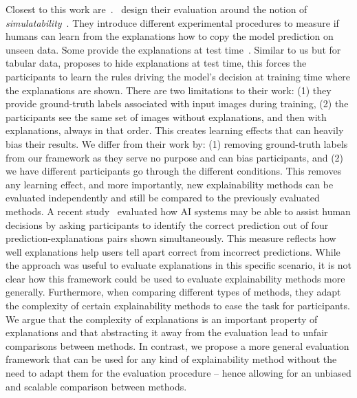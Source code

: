 Closest to this work are~\cite{nguyen2018comparing,shen2020useful,hase2020evaluating, kim2021hive, sixt2022users}.~\cite{nguyen2018comparing,shen2020useful,hase2020evaluating} design their evaluation around the notion of \textit{simulatability}~\cite{kim2016examples, doshivelez2017rigorous}. They introduce different experimental procedures to measure if humans can learn from the explanations how to copy the model prediction on unseen data. Some provide the explanations at test time~\cite{nguyen2018comparing, shen2020useful}. Similar to us but for tabular data, \cite{hase2020evaluating} proposes to hide explanations at test time, this forces the participants to learn the rules driving the model's decision at training time where the explanations are shown. There are two limitations to their work: (1) they provide ground-truth labels associated with input images during training, (2) the participants see the same set of images without explanations, and then with explanations, always in that order. This creates learning effects that can heavily bias their results. We differ from their work by: (1) removing ground-truth labels from our framework as they serve no purpose and can bias participants, and (2) we have different participants go through the different conditions. This removes any learning effect, and more importantly, new explainability methods can be evaluated independently and still be compared to the previously evaluated methods. 
A recent study~\cite{kim2021hive} evaluated how AI systems may be able to assist human decisions by asking participants to identify the correct prediction out of four prediction-explanations pairs shown simultaneously. This measure reflects how well explanations help users tell apart correct from incorrect predictions. While the approach was useful to evaluate explanations in this specific scenario, it is not clear how this framework could be used to evaluate explainability methods more generally. Furthermore, when comparing different types of methods, they adapt the complexity of certain explainability methods to ease the task for participants. We argue that the complexity of explanations is an important property of explanations and that abstracting it away from the evaluation lead to unfair comparisons between methods.
In contrast, we propose a more general evaluation framework that can be used for any kind of explainability method without the need to adapt them for the evaluation procedure -- hence allowing for an unbiased and scalable comparison between methods.
